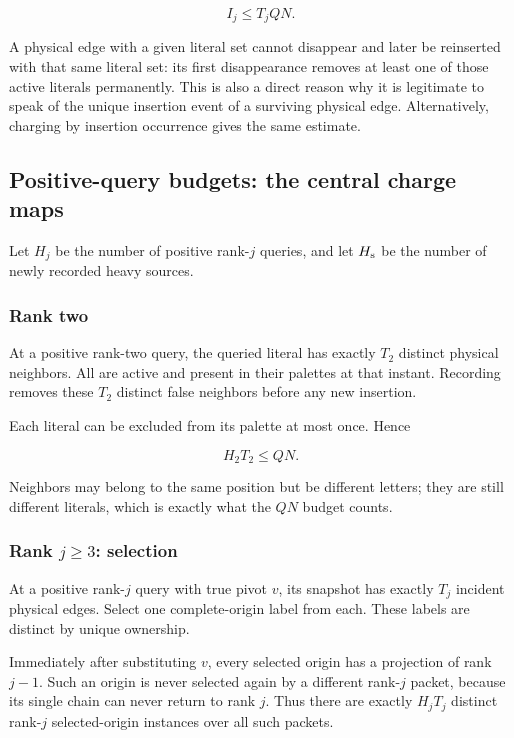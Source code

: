 \[
I_j\le T_jQN. \tag{7.1}
\]

A physical edge with a given literal set cannot disappear and later be reinserted with that same literal set: its first disappearance removes at least one of those active literals permanently. This is also a direct reason why it is legitimate to speak of the unique insertion event of a surviving physical edge. Alternatively, charging by insertion occurrence gives the same estimate.

\subsection{Positive-query budgets: the central charge maps}\label{positive-query-budgets-the-central-charge-maps}

Let \(H_j\) be the number of positive rank-\(j\) queries, and let \(H_{\rm s}\) be the number of newly recorded heavy sources.

\subsubsection{Rank two}\label{rank-two}

At a positive rank-two query, the queried literal has exactly \(T_2\) distinct physical neighbors. All are active and present in their palettes at that instant. Recording removes these \(T_2\) distinct false neighbors before any new insertion.

Each literal can be excluded from its palette at most once. Hence

\[
H_2T_2\le QN. \tag{8.1}
\]

Neighbors may belong to the same position but be different letters; they are still different literals, which is exactly what the \(QN\) budget counts.

\subsubsection{\texorpdfstring{Rank \(j\ge3\): selection}{Rank j\textbackslash ge3: selection}}\label{rank-jge3-selection}

At a positive rank-\(j\) query with true pivot \(v\), its snapshot has exactly \(T_j\) incident physical edges. Select one complete-origin label from each. These labels are distinct by unique ownership.

Immediately after substituting \(v\), every selected origin has a projection of rank \(j-1\). Such an origin is never selected again by a different rank-\(j\) packet, because its single chain can never return to rank \(j\). Thus there are exactly \(H_jT_j\) distinct rank-\(j\) selected-origin instances over all such packets.

